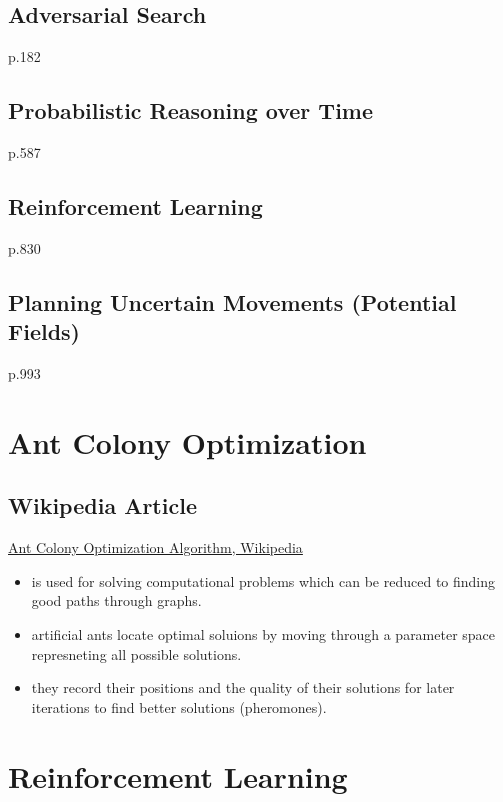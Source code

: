 \subsection{Adversarial Search}
p.182

\subsection{Probabilistic Reasoning over Time}
p.587

\subsection{Reinforcement Learning}
p.830

\subsection{Planning Uncertain Movements (Potential Fields)}
p.993


\section{Ant Colony Optimization}
\subsection{Wikipedia Article}
\href{https://en.wikipedia.org/wiki/Ant_colony_optimization_algorithms}{Ant Colony Optimization Algorithm, Wikipedia}
\begin{itemize}[noitemsep,nolistsep]
	\item is used for solving computational problems which can be reduced to finding good paths through graphs.
	\item artificial ants locate optimal soluions by moving through a parameter space represneting all possible solutions.
	\item they record their positions and the quality of their solutions for later iterations to find better solutions (pheromones).
\end{itemize}
\section{Reinforcement Learning}
